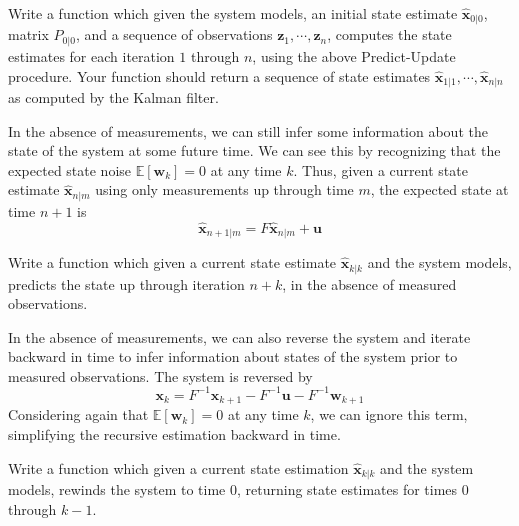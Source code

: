 \begin{problem}
Write a function which given the system models, an initial state estimate $\widehat{\mathbf{x}}_{0|0}$, matrix $P_{0|0}$, and a sequence of observations $\mathbf{z}_{1}, \cdots, \mathbf{z}_{n}$, computes the state estimates for each iteration $1$ through $n$, using the above Predict-Update procedure. Your function should return a sequence of state estimates $\widehat{\mathbf{x}}_{1|1}, \cdots, \widehat{\mathbf{x}}_{n|n}$ as computed by the Kalman filter.
\end{problem}

In the absence of measurements, we can still infer some information about the state of the system at some future time. We can see this by recognizing that the expected state noise $\mathbb{E}\left[\mathbf{w}_{k}\right] = 0$ at any time $k$. Thus, given a current state estimate $\widehat{\mathbf{x}}_{n|m}$ using only measurements up through time $m$, the expected state at time $n+1$ is 
\begin{equation*}
\widehat{\mathbf{x}}_{n+1|m} = F \widehat{\mathbf{x}}_{n|m} + \mathbf{u}
\end{equation*}

\begin{problem}
Write a function which given a current state estimate $\widehat{\mathbf{x}}_{k|k}$ and the system models, predicts the state up through iteration $n+k$, in the absence of measured observations.
\end{problem}

In the absence of measurements, we can also reverse the system and iterate backward in time to infer information about states of the system prior to measured observations. The system is reversed by
\begin{equation*}
\mathbf{x}_{k} = F^{-1}\mathbf{x}_{k+1} - F^{-1}\mathbf{u} - F^{-1}\mathbf{w}_{k+1}
\end{equation*}
Considering again that $\mathbb{E}\left[\mathbf{w}_{k}\right] = 0$ at any time $k$, we can ignore this term, simplifying the recursive estimation backward in time.

\begin{problem}
Write a function which given a current state estimation $\widehat{\mathbf{x}}_{k|k}$ and the system models, rewinds the system to time $0$, returning state estimates for times $0$ through $k-1$.
\end{problem}